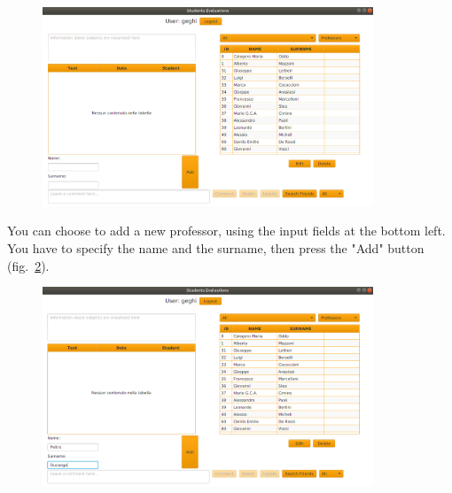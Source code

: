 \documentclass[a4paper]{article}
\begin{document}
\begin{figure}[h]
\centering
\includegraphics[width=0.88\textwidth]{images/screens/admin0}
\label{fig:admin0}
\end{figure}

You can choose to add a new professor, using the input fields at the bottom left. You have to specify the name and the surname, then press the "Add" button (fig.~\ref{fig:admin1}).

\begin{figure}[h]
\centering
\includegraphics[width=0.88\textwidth]{images/screens/admin1}
\label{fig:admin1}
\end{figure}
\end{document}
